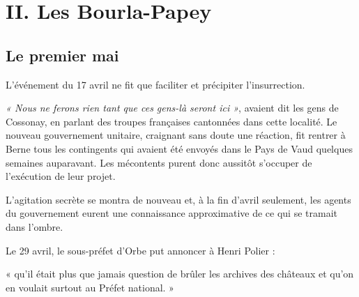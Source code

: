 \documentclass[french,twoside]{book} %
\newenvironment{quoteblock}%
  {\begin{quoting}}
  {\end{quoting}}
\newcommand\chapteropen{} %
\newcommand\chaptercont{} %
\newenvironment{quotebar}{%
    \def\FrameCommand{{\color{rubric!10!}\vrule width 0.5em} \hspace{0.9em}}%
    \def\OuterFrameSep{\itemsep} %
    \MakeFramed {\advance\hsize-\width \FrameRestore}
  }%
  {%
    \endMakeFramed
  }
\renewenvironment{quoteblock}%
  {%
    \savenotes
    \setstretch{0.9}
    \begin{quotebar}
  }
  {%
    \end{quotebar}
    \spewnotes
  }
\begin{document}
\chapteropen
\chapter[II. Les Bourla-Papey]{II. Les Bourla-Papey}

\chaptercont
\section[Le premier mai]{Le premier mai}
\noindent L’événement du 17 avril ne fit que faciliter et précipiter l’insurrection.\par
\emph{« Nous ne ferons rien tant que ces gens-là seront ici »}, avaient dit les gens de Cossonay, en parlant des troupes françaises cantonnées dans cette localité. Le nouveau gouvernement unitaire, craignant sans doute une réaction, fit rentrer à Berne tous les contingents qui avaient été envoyés dans le Pays de Vaud quelques semaines auparavant. Les mécontents purent donc aussitôt s’occuper de l’exécution de leur projet.\par
L’agitation secrète se montra de nouveau et, à la fin d’avril seulement, les agents du gouvernement eurent une connaissance approximative de ce qui se tramait dans l’ombre.\par
Le 29 avril, le sous-préfet d’Orbe put annoncer à Henri Polier :\par

\begin{quoteblock}
\noindent « qu’il était plus que jamais question de brûler les archives des châteaux et qu’on en voulait surtout au Préfet national. »\end{quoteblock}
\end{document}
